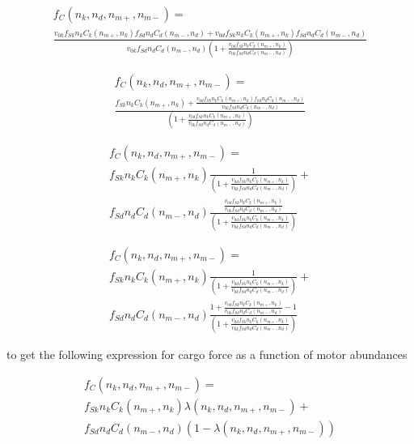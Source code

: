 \begin{equation}
\begin{split}
f_C(n_k, n_d, n_{m+}, n_{m-}) = \\
\frac{v_{0k}f_{Sk}n_kC_k(n_{m+}, n_k)f_{Sd}n_dC_d(n_{m-},n_d) + v_{0d}f_{Sk}n_kC_k(n_{m+}, n_k)f_{Sd}n_dC_d(n_{m-},n_d)}
{v_{0k}f_{Sd}n_dC_d(n_{m-},n_d) (1 + \frac{v_{0d}f_{Sk}n_kC_k(n_{m+}, n_k)}{v_{0k}f_{Sd}n_dC_d(n_{m-},n_d)})}
\end{split}
\end{equation}

\begin{equation}
\begin{split}
f_C(n_k, n_d, n_{m+}, n_{m-}) = \\
\frac{f_{Sk}n_kC_k(n_{m+}, n_k) + \frac{v_{0d}f_{Sk}n_kC_k(n_{m+}, n_k)f_{Sd}n_dC_d(n_{m-},n_d)}{v_{0k}f_{Sd}n_dC_d(n_{m-},n_d)}}
{(1 + \frac{v_{0d}f_{Sk}n_kC_k(n_{m+}, n_k)}{v_{0k}f_{Sd}n_dC_d(n_{m-},n_d)})}
\end{split}
\end{equation}

\begin{equation}
\begin{split}
f_C(n_k, n_d, n_{m+}, n_{m-}) = \\
f_{Sk}n_kC_k(n_{m+}, n_k) \frac{1}{(1 + \frac{v_{0d}f_{Sk}n_kC_k(n_{m+}, n_k)}{v_{0k}f_{Sd}n_dC_d(n_{m-},n_d)})} + \\
f_{Sd}n_dC_d(n_{m-},n_d)\frac{\frac{v_{0d}f_{Sk}n_kC_k(n_{m+}, n_k)}{v_{0k}f_{Sd}n_dC_d(n_{m-},n_d)}}
{(1 + \frac{v_{0d}f_{Sk}n_kC_k(n_{m+}, n_k)}{v_{0k}f_{Sd}n_dC_d(n_{m-},n_d)})}
\end{split}
\end{equation}

\begin{equation}
\begin{split}
f_C(n_k, n_d, n_{m+}, n_{m-}) = \\
f_{Sk}n_kC_k(n_{m+}, n_k) \frac{1}{(1 + \frac{v_{0d}f_{Sk}n_kC_k(n_{m+}, n_k)}{v_{0k}f_{Sd}n_dC_d(n_{m-},n_d)})} + \\
f_{Sd}n_dC_d(n_{m-},n_d)\frac{1+\frac{v_{0d}f_{Sk}n_kC_k(n_{m+}, n_k)}{v_{0k}f_{Sd}n_dC_d(n_{m-},n_d)}-1}
{(1 + \frac{v_{0d}f_{Sk}n_kC_k(n_{m+}, n_k)}{v_{0k}f_{Sd}n_dC_d(n_{m-},n_d)})}
\end{split}
\end{equation}

to get the following expression for cargo force as a function of motor abundances

\begin{equation}
\begin{split}
f_C(n_k, n_d, n_{m+}, n_{m-}) = \\
f_{Sk}n_kC_k(n_{m+}, n_k) \lambda(n_k, n_d, n_{m+}, n_{m-}) + \\
f_{Sd}n_dC_d(n_{m-},n_d)( 1 - \lambda(n_k, n_d, n_{m+}, n_{m-}) )
\end{split}
\end{equation}

